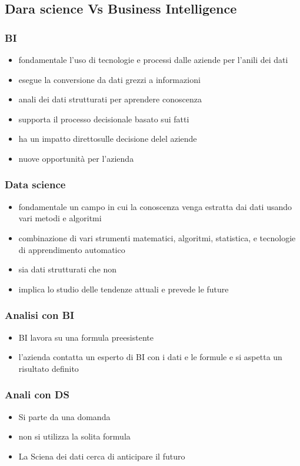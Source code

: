 \subsection{Dara science Vs Business Intelligence}
\subsubsection{BI}
\begin{itemize}
    \item fondamentale l'uso di tecnologie e processi dalle aziende per l'anili dei dati
    \item esegue la conversione da dati grezzi a informazioni
    \item anali dei dati strutturati per aprendere conoscenza
    \item supporta il processo decisionale basato sui fatti
    \item ha un impatto direttosulle decisione delel aziende
    \item nuove opportunità per l'azienda
\end{itemize}

\subsubsection{Data science}
\begin{itemize}
    \item fondamentale un campo in cui la conoscenza venga estratta dai dati usando vari metodi e algoritmi
    \item combinazione di vari strumenti matematici, algoritmi, statistica, e tecnologie di apprendimento automatico
    \item sia dati strutturati che non
    \item implica lo studio delle tendenze attuali e prevede le future
\end{itemize}


\subsubsection{Analisi con BI}
\begin{itemize}
    \item BI lavora su una formula preesistente
    \item l'azienda contatta un esperto di BI con i dati e le formule e si aspetta un risultato definito
\end{itemize}
\subsubsection{Anali con DS}
\begin{itemize}
    \item Si parte da una domanda
    \item non si utilizza la solita formula
    \item La Sciena dei dati cerca di anticipare il futuro
\end{itemize}

